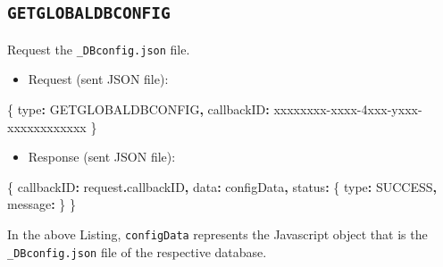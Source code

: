 \documentclass[
]{book}
\newenvironment{Shaded}{\begin{snugshade}}{\end{snugshade}}
\newcommand{\AttributeTok}[1]{\textcolor[rgb]{0.77,0.63,0.00}{#1}}
\newcommand{\NormalTok}[1]{#1}
\newcommand{\OperatorTok}[1]{\textcolor[rgb]{0.81,0.36,0.00}{\textbf{#1}}}
\newcommand{\StringTok}[1]{\textcolor[rgb]{0.31,0.60,0.02}{#1}}
\providecommand{\tightlist}{%
  \setlength{\itemsep}{0pt}\setlength{\parskip}{0pt}}
\begin{document}
\hypertarget{getglobaldbconfig}{%
\subsection{\texorpdfstring{\texttt{GETGLOBALDBCONFIG}}{GETGLOBALDBCONFIG}}\label{getglobaldbconfig}}

Request the \texttt{\_DBconfig.json} file.

\begin{itemize}
\tightlist
\item
  Request (sent JSON file):
\end{itemize}

\begin{Shaded}
\begin{Highlighting}[]
\NormalTok{\{}
  \StringTok{\textquotesingle{}type\textquotesingle{}}\OperatorTok{:} \StringTok{\textquotesingle{}GETGLOBALDBCONFIG\textquotesingle{}}\OperatorTok{,}
  \StringTok{\textquotesingle{}callbackID\textquotesingle{}}\OperatorTok{:} \StringTok{\textquotesingle{}xxxxxxxx{-}xxxx{-}4xxx{-}yxxx{-}xxxxxxxxxxxx\textquotesingle{}}
\NormalTok{\}}
\end{Highlighting}
\end{Shaded}

\begin{itemize}
\tightlist
\item
  Response (sent JSON file):
\end{itemize}

\begin{Shaded}
\begin{Highlighting}[]
\NormalTok{\{}
  \StringTok{\textquotesingle{}callbackID\textquotesingle{}}\OperatorTok{:}\NormalTok{ request}\OperatorTok{.}\AttributeTok{callbackID}\OperatorTok{,}
  \StringTok{\textquotesingle{}data\textquotesingle{}}\OperatorTok{:}\NormalTok{ configData}\OperatorTok{,}
  \StringTok{\textquotesingle{}status\textquotesingle{}}\OperatorTok{:}\NormalTok{ \{}
    \StringTok{\textquotesingle{}type\textquotesingle{}}\OperatorTok{:} \StringTok{\textquotesingle{}SUCCESS\textquotesingle{}}\OperatorTok{,}
    \StringTok{\textquotesingle{}message\textquotesingle{}}\OperatorTok{:} \StringTok{\textquotesingle{}\textquotesingle{}}
\NormalTok{  \}}
\NormalTok{\}}
\end{Highlighting}
\end{Shaded}

In the above Listing, \texttt{configData} represents the Javascript object that is the \texttt{\_DBconfig.json} file of the respective database.
\end{document}
